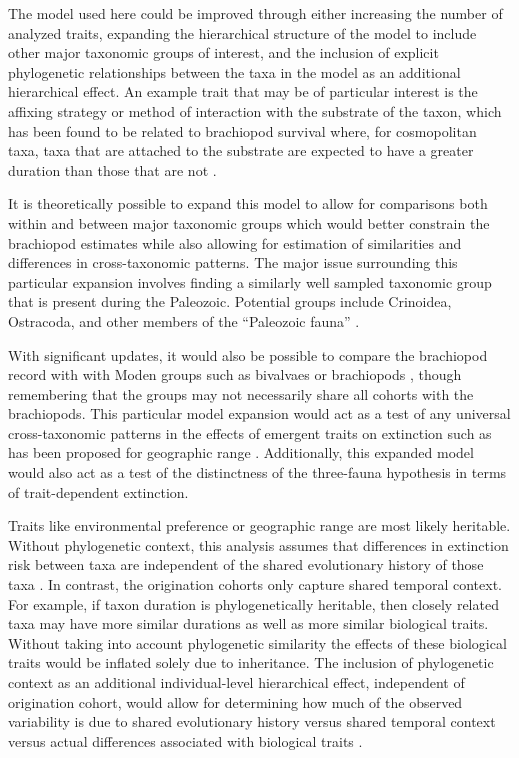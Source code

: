 \documentclass{article}
\begin{document}
The model used here could be improved through either increasing the number of analyzed traits, expanding the hierarchical structure of the model to include other major taxonomic groups of interest, and the inclusion of explicit phylogenetic relationships between the taxa in the model as an additional hierarchical effect. An example trait that may be of particular interest is the affixing strategy or method of interaction with the substrate of the taxon, which has been found to be related to brachiopod survival where, for cosmopolitan taxa, taxa that are attached to the substrate are expected to have a greater duration than those that are not \citep{Alexander1977}.

It is theoretically possible to expand this model to allow for comparisons both within and between major taxonomic groups which would better constrain the brachiopod estimates while also allowing for estimation of similarities and differences in cross-taxonomic patterns. The major issue surrounding this particular expansion involves finding a similarly well sampled taxonomic group that is present during the Paleozoic. Potential groups include Crinoidea, Ostracoda, and other members of the ``Paleozoic fauna'' \citep{Sepkoski1981a}.

With significant updates, it would also be possible to compare the brachiopod record with with Moden groups such as bivalvaes or brachiopods \citep{Sepkoski1981a}, though remembering that the groups may not necessarily share all cohorts with the brachiopods. This particular model expansion would act as a test of any universal cross-taxonomic patterns in the effects of emergent traits on extinction such as has been proposed for geographic range \citep{Payne2007}. Additionally, this expanded model would also act as a test of the distinctness of the \citet{Sepkoski1981a} three-fauna hypothesis in terms of trait-dependent extinction.

Traits like environmental preference or geographic range \citep{Jablonski1987,Hunt2005b} are most likely heritable. Without phylogenetic context, this analysis assumes that differences in extinction risk between taxa are independent of the shared evolutionary history of those  taxa \citep{Felsenstein1985b}. In contrast, the origination cohorts only capture shared temporal context. For example, if taxon duration is phylogenetically heritable, then closely related taxa may have more similar durations as well as more similar biological traits. Without taking into account phylogenetic similarity the effects of these biological traits would be inflated solely due to inheritance. The inclusion of phylogenetic context as an additional individual-level hierarchical effect, independent of origination cohort, would allow for determining how much of the observed variability is due to shared evolutionary history versus shared temporal context versus actual differences associated with biological traits \citep{Smits2015}.
\end{document}

